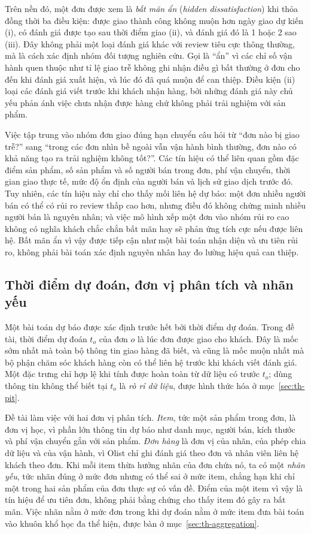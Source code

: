 Trên nền đó, một đơn được xem là \emph{bất mãn ẩn} (\emph{hidden dissatisfaction}) khi thỏa đồng thời ba điều kiện: được giao thành công không muộn hơn ngày giao dự kiến (i), có đánh giá được tạo sau thời điểm giao (ii), và đánh giá đó là 1 hoặc 2 sao (iii). Đây không phải một loại đánh giá khác với review tiêu cực thông thường, mà là cách xác định nhóm đối tượng nghiên cứu. Gọi là ``ẩn'' vì các chỉ số vận hành quen thuộc như tỉ lệ giao trễ không ghi nhận điều gì bất thường ở đơn cho đến khi đánh giá xuất hiện, và lúc đó đã quá muộn để can thiệp. Điều kiện (ii) loại các đánh giá viết trước khi khách nhận hàng, bởi những đánh giá này chủ yếu phản ánh việc chưa nhận được hàng chứ không phải trải nghiệm với sản phẩm.

Việc tập trung vào nhóm đơn giao đúng hạn chuyển câu hỏi từ ``đơn nào bị giao trễ?'' sang ``trong các đơn nhìn bề ngoài vẫn vận hành bình thường, đơn nào có khả năng tạo ra trải nghiệm không tốt?''. Các tín hiệu có thể liên quan gồm đặc điểm sản phẩm, số sản phẩm và số người bán trong đơn, phí vận chuyển, thời gian giao thực tế, mức độ ổn định của người bán và lịch sử giao dịch trước đó. Tuy nhiên, các tín hiệu này chỉ cho thấy mối liên hệ dự báo: một đơn nhiều người bán có thể có rủi ro review thấp cao hơn, nhưng điều đó không chứng minh nhiều người bán là nguyên nhân; và việc mô hình xếp một đơn vào nhóm rủi ro cao không có nghĩa khách chắc chắn bất mãn hay sẽ phản ứng tích cực nếu được liên hệ. Bất mãn ẩn vì vậy được tiếp cận như một bài toán nhận diện và ưu tiên rủi ro, không phải bài toán xác định nguyên nhân hay đo lường hiệu quả can thiệp.

\subsection{Thời điểm dự đoán, đơn vị phân tích và nhãn yếu}\label{sec:con-units}

Một bài toán dự báo được xác định trước hết bởi thời điểm dự đoán. Trong đề tài, thời điểm dự đoán $t_o$ của đơn $o$ là lúc đơn được giao cho khách. Đây là mốc sớm nhất mà toàn bộ thông tin giao hàng đã biết, và cũng là mốc muộn nhất mà bộ phận chăm sóc khách hàng còn có thể liên hệ trước khi khách viết đánh giá. Một đặc trưng chỉ hợp lệ khi tính được hoàn toàn từ dữ liệu có trước $t_o$; dùng thông tin không thể biết tại $t_o$ là \emph{rò rỉ dữ liệu}, được hình thức hóa ở mục~\ref{sec:th-pit}.

Đề tài làm việc với hai đơn vị phân tích. \emph{Item}, tức một sản phẩm trong đơn, là đơn vị học, vì phần lớn thông tin dự báo như danh mục, người bán, kích thước và phí vận chuyển gắn với sản phẩm. \emph{Đơn hàng} là đơn vị của nhãn, của phép chia dữ liệu và của vận hành, vì Olist chỉ ghi đánh giá theo đơn và nhân viên liên hệ khách theo đơn. Khi mỗi item thừa hưởng nhãn của đơn chứa nó, ta có một \emph{nhãn yếu}, tức nhãn đúng ở mức đơn nhưng có thể sai ở mức item, chẳng hạn khi chỉ một trong hai sản phẩm của đơn thực sự có vấn đề. Điểm của một item vì vậy là tín hiệu để ưu tiên đơn, không phải bằng chứng cho thấy item đó gây ra bất mãn. Việc nhãn nằm ở mức đơn trong khi dự đoán nằm ở mức item đưa bài toán vào khuôn khổ học đa thể hiện, được bàn ở mục~\ref{sec:th-aggregation}.

